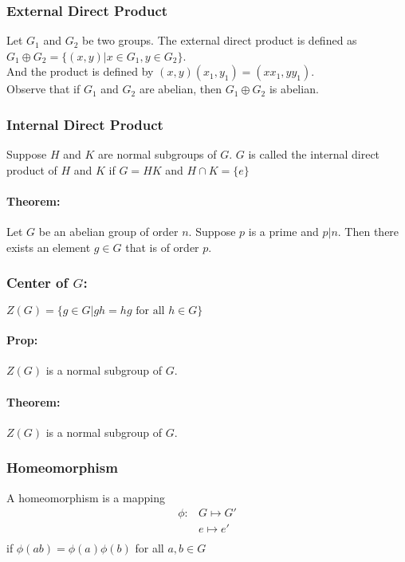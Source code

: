 \documentclass[11pt, letterpaper]{article}
\begin{document}
\subsubsection{External Direct Product}
	Let $G_1$ and $G_2$ be two groups.
	The external direct product is defined as \\
	$G_1 \oplus G_2 = \{ (x, y) | x \in G_1, y \in G_2 \}$.\\
	And the product is defined by $(x, y)(x_1, y_1) = (xx_1, yy_1)$.\\
	Observe that if $G_1$ and $G_2$ are abelian, then $G_1 \oplus G_2$ is abelian.

\subsubsection{Internal Direct Product}
	Suppose $H$ and $K$ are normal subgroups of $G$.
	$G$ is called the internal direct product of $H$ and $K$ if $G = HK$ and $ H \cap K = \{ e \}$

\paragraph{Theorem: }
	Let $G$ be an abelian group of order $n$.
	Suppose $p$ is a prime and $p | n$.
	Then there exists an element $g \in G$ that is of order $p$.

\subsubsection{Center of $G$:}
	$Z(G) = \{ g \in G | gh = hg \text{ for all } h \in G\}$ \\

	\paragraph{Prop: }
		$Z(G)$ is a normal subgroup of $G$.

\paragraph{Theorem: }
	$Z(G)$ is a normal subgroup of $G$.

\subsubsection{Homeomorphism}
	A homeomorphism is a mapping
	\begin{align*}
		\phi: &G \mapsto G' \\
		&e \mapsto e '\\
	\end{align*}
	if $\phi(ab) = \phi(a) \phi(b)$ for all $a, b \in G$
\end{document}

